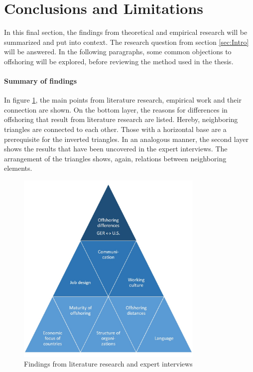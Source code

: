 
\section{Conclusions and Limitations}


In this final section, the findings from theoretical and empirical research will be summarized and put into context. The research question from section \ref{sec:Intro} will be answered. In the following paragraphs, some common objections to offshoring will be explored, before reviewing the method used in the thesis.

\paragraph{Summary of findings}
In figure \ref{fig:ThesisResults}, the main points from literature research, empirical work and their connection are shown. On the bottom layer, the reasons for differences in offshoring that result from literature research are listed. Hereby, neighboring triangles are connected to each other. Those with a horizontal base are a prerequisite for the inverted triangles. In an analogous manner, the second layer shows the results that have been uncovered in the expert interviews. The arrangement of the triangles shows, again, relations between neighboring elements.

\begin{figure}[htb]
	\centering
	\includegraphics[width=0.8\textwidth]{Pictures/Results}
	\caption{Findings from literature research and expert interviews}
	\label{fig:ThesisResults}
\end{figure}


